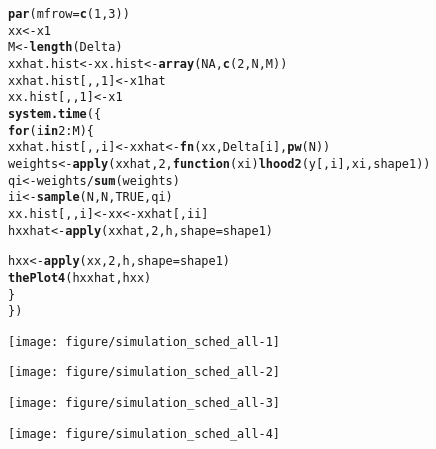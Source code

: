 \documentclass[11pt]{article}\usepackage[]{graphicx}\usepackage[]{color}
\makeatletter
\def\maxwidth{ %
  \ifdim\Gin@nat@width>\linewidth
    \linewidth
  \else
    \Gin@nat@width
  \fi
}
\newcommand{\hlnum}[1]{\textcolor[rgb]{0.686,0.059,0.569}{#1}}%
\newcommand{\hlopt}[1]{\textcolor[rgb]{0,0,0}{#1}}%
\newcommand{\hlstd}[1]{\textcolor[rgb]{0.345,0.345,0.345}{#1}}%
\newcommand{\hlkwa}[1]{\textcolor[rgb]{0.161,0.373,0.58}{\textbf{#1}}}%
\newcommand{\hlkwb}[1]{\textcolor[rgb]{0.69,0.353,0.396}{#1}}%
\newcommand{\hlkwc}[1]{\textcolor[rgb]{0.333,0.667,0.333}{#1}}%
\newcommand{\hlkwd}[1]{\textcolor[rgb]{0.737,0.353,0.396}{\textbf{#1}}}%
\newenvironment{kframe}{%
 \def\at@end@of@kframe{}%
 \ifinner\ifhmode%
  \def\at@end@of@kframe{\end{minipage}}%
  \begin{minipage}{\columnwidth}%
 \fi\fi%
 \def\FrameCommand##1{\hskip\@totalleftmargin \hskip-\fboxsep
 \colorbox{shadecolor}{##1}\hskip-\fboxsep
     \hskip-\linewidth \hskip-\@totalleftmargin \hskip\columnwidth}%
 \MakeFramed {\advance\hsize-\width
   \@totalleftmargin\z@ \linewidth\hsize
   \@setminipage}}%
 {\par\unskip\endMakeFramed%
 \at@end@of@kframe}
\newenvironment{knitrout}{}{} %
\makeatother
\begin{document}
\begin{knitrout}
\color{fgcolor}\begin{kframe}
\begin{alltt}
\hlkwd{par}\hlstd{(}\hlkwc{mfrow} \hlstd{=} \hlkwd{c}\hlstd{(}\hlnum{1}\hlstd{,} \hlnum{3}\hlstd{))}
\hlstd{xx} \hlkwb{<-} \hlstd{x1}
\hlstd{M} \hlkwb{<-} \hlkwd{length}\hlstd{(Delta)}
\hlstd{xxhat.hist} \hlkwb{<-} \hlstd{xx.hist} \hlkwb{<-} \hlkwd{array}\hlstd{(}\hlnum{NA}\hlstd{,} \hlkwd{c}\hlstd{(}\hlnum{2}\hlstd{, N, M))}
\hlstd{xxhat.hist[,,}\hlnum{1}\hlstd{]} \hlkwb{<-} \hlstd{x1hat}
\hlstd{xx.hist[,,}\hlnum{1}\hlstd{]} \hlkwb{<-} \hlstd{x1}
\hlkwd{system.time}\hlstd{(\{}
    \hlkwa{for} \hlstd{(i} \hlkwa{in} \hlnum{2}\hlopt{:}\hlstd{M) \{}
        \hlstd{xxhat.hist[,,i]} \hlkwb{<-} \hlstd{xxhat} \hlkwb{<-} \hlkwd{fn}\hlstd{(xx, Delta[i],} \hlkwd{pw}\hlstd{(N))}
        \hlstd{weights} \hlkwb{<-} \hlkwd{apply}\hlstd{(xxhat,} \hlnum{2}\hlstd{,} \hlkwa{function}\hlstd{(}\hlkwc{xi}\hlstd{)} \hlkwd{lhood2}\hlstd{(y[, i], xi, shape1))}
        \hlstd{qi} \hlkwb{<-} \hlstd{weights} \hlopt{/} \hlkwd{sum}\hlstd{(weights)}
        \hlstd{ii} \hlkwb{<-} \hlkwd{sample}\hlstd{(N, N,} \hlnum{TRUE}\hlstd{, qi)}
        \hlstd{xx.hist[,,i]} \hlkwb{<-} \hlstd{xx} \hlkwb{<-} \hlstd{xxhat[, ii]}
        \hlstd{hxxhat} \hlkwb{<-} \hlkwd{apply}\hlstd{(xxhat,} \hlnum{2}\hlstd{, h,} \hlkwc{shape} \hlstd{= shape1)}

        \hlstd{hxx} \hlkwb{<-} \hlkwd{apply}\hlstd{(xx,} \hlnum{2}\hlstd{, h,} \hlkwc{shape} \hlstd{= shape1)}
        \hlkwd{thePlot4}\hlstd{(hxxhat, hxx)}
    \hlstd{\}}
\hlstd{\})}
\end{alltt}
\end{kframe}

{\centering \texttt{[image: figure/simulation\_sched\_all-1]} 

}




{\centering \texttt{[image: figure/simulation\_sched\_all-2]} 

}




{\centering \texttt{[image: figure/simulation\_sched\_all-3]} 

}




{\centering \texttt{[image: figure/simulation\_sched\_all-4]} 

}





\end{knitrout}
\end{document}
